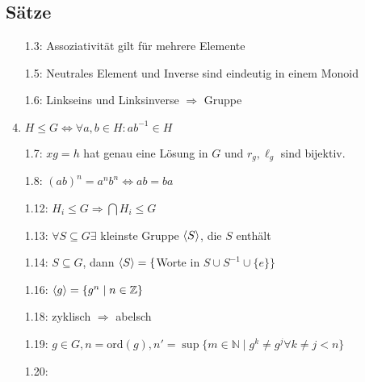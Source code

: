 \documentclass[twocolumn]{report}
\begin{document}
\subsection*{Sätze}
\begin{enumerate}[itemsep=0pt, topsep=0pt, parsep=0pt, partopsep=0pt, leftmargin=*]
    \item[1.3:] Assoziativität gilt für mehrere Elemente
    \item[1.5:] Neutrales Element und Inverse sind eindeutig in einem Monoid
    \item[1.6:] Linkseins und Linksinverse $\Rightarrow$ Gruppe
    \item $H \leq G \Leftrightarrow \forall a, b \in H : ab^{-1} \in H$
    \item[1.7:] $xg = h$ hat genau eine Lösung in $G$ und $r_g, \ell_g$ sind bijektiv.
    \item[1.8:] $(ab)^n=a^nb^n \Leftrightarrow ab = ba$
    \item[1.12:] $H_i \leq G \Rightarrow \bigcap H_i \leq G$
    \item[1.13:] $\forall S \subseteq G \exists$ kleinste Gruppe $\langle S\rangle$, die $S$ enthält
    \item[1.14:] $S \subseteq G$, dann $\langle S\rangle = \{$Worte in $S \cup S^{-1} \cup \{e\}\}$
    \item[1.16:] $\langle g\rangle = \{g^n \mid n \in \mathbb{Z}\}$
    \item[1.18:] zyklisch $\Rightarrow$ abelsch
    \item[1.19:] $g \in G, n = \text{ord}(g), n' = \sup\{m \in \mathbb{N} \mid g^k \neq g^j \forall k \neq j < n\}$
    \item[1.20:]
\end{enumerate}
\end{document}
